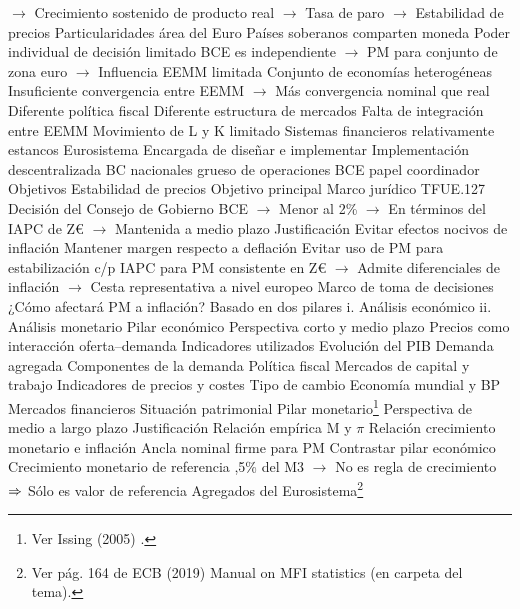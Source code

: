 \documentclass{nuevotema}
\begin{document}
\begin{esquemal}
				\4[] $\to$ Crecimiento sostenido de producto real
				\4[] $\to$ Tasa de paro
				\4[] $\to$ Estabilidad de precios
			\3 Particularidades área del Euro
				\4 Países soberanos comparten moneda
				\4[] Poder individual de decisión limitado
				\4[] BCE es independiente
				\4[] $\to$ PM para conjunto de zona euro
				\4[] $\to$ Influencia EEMM limitada
				\4 Conjunto de economías heterogéneas
				\4[] Insuficiente convergencia entre EEMM
				\4[] $\to$ Más convergencia nominal que real
				\4[] Diferente política fiscal
				\4[] Diferente estructura de mercados
				\4 Falta de integración entre EEMM
				\4[] Movimiento de L y K limitado
				\4[] Sistemas financieros relativamente estancos
			\3 Eurosistema
				\4 Encargada de diseñar e implementar
				\4 Implementación descentralizada
				\4[] BC nacionales grueso de operaciones
				\4[] BCE papel coordinador
		\2 Objetivos
			\3 Estabilidad de precios
				\4 Objetivo principal
				\4 Marco jurídico
				\4[] TFUE.127
				\4[] Decisión del Consejo de Gobierno BCE
				\4[] $\to$ Menor al 2\%
				\4[] $\to$ En términos del IAPC de Z€
				\4[] $\to$ Mantenida a medio plazo
				\4 Justificación
				\4[] Evitar efectos nocivos de inflación
				\4[] Mantener margen respecto a deflación
				\4[] Evitar uso de PM para estabilización c/p
				\4[] IAPC para PM consistente en Z€
				\4[] $\to$ Admite diferenciales de inflación
				\4[] $\to$ Cesta representativa a nivel europeo
				\4 Marco de toma de decisiones
				\4[] ¿Cómo afectará PM a inflación?
				\4[] Basado en dos pilares
				\4[] i. Análisis económico
				\4[] ii. Análisis monetario
			\3 Pilar económico
				\4 Perspectiva corto y medio plazo
				\4 Precios como interacción oferta--demanda
				\4 Indicadores utilizados
				\4[] Evolución del PIB
				\4[] Demanda agregada
				\4[] Componentes de la demanda
				\4[] Política fiscal
				\4[] Mercados de capital y trabajo
				\4[] Indicadores de precios y costes
				\4[] Tipo de cambio
				\4[] Economía mundial y BP
				\4[] Mercados financieros
				\4[] Situación patrimonial
			\3 Pilar monetario\footnote{Ver Issing (2005) .}
				\4 Perspectiva de medio a largo plazo
				\4 Justificación
				\4[] Relación empírica M y $\pi$
				\4 Relación crecimiento monetario e inflación
				\4 Ancla nominal firme para PM
				\4 Contrastar pilar económico
				\4 Crecimiento monetario de referencia
				,5\% del M3
				\4[] $\to$ No es regla de crecimiento
				\4[] $\Rightarrow$ Sólo es valor de referencia
				\4 Agregados del Eurosistema\footnote{Ver pág. 164 de ECB (2019) Manual on MFI statistics (en carpeta del tema). }

\end{esquemal}
\end{document}

